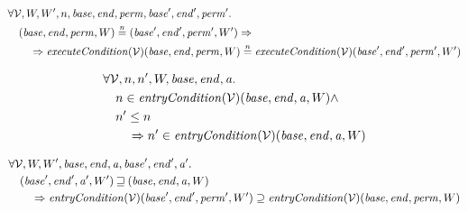 \documentclass{article}
\newcommand{\nequal}[1][n]{\stackrel{\tiny{#1}}{=}}
\newcommand{\var}[1]{\mathit{#1}}
\newcommand{\addr}{\var{a}}
\newcommand{\start}{\var{base}}
\newcommand{\addrend}{\var{end}}
\newcommand{\perm}{\var{perm}}
\newcommand{\plainfun}[2]{
  \ifthenelse{\equal{#2}{}}
             {\mathit{#1}}
             {\mathit{#1}(#2)}
}
\newcommand{\execCond}[1]{\plainfun{executeCondition}{#1}}
\newcommand{\entryCond}[1]{\plainfun{entryCondition}{#1}}
\newcommand{\future}{\mathbin{\sqsupseteq}}
\newcommand{\asmType}{\plaindom{AsmType}}
\newcommand{\plaindom}[1]{\mathrm{#1}}
\newcommand{\intr}[2]{\mathcal{#1}}
\newcommand{\valueintr}[1]{\intr{V}{#1}}
\newcommand{\stdvr}{\valueintr{\asmType}}
\begin{document}
\begin{lemma}
\label{lem:ec-ne-world}
  \begin{align*}
    &\forall \stdvr, W, W',n,\start,\addrend,\perm,\start',\addrend',\perm' \ldotp \\
    &\quad (\start,\addrend,\perm,W) \nequal (\start',\addrend',\perm',W') \Rightarrow \\
    &\qquad \Rightarrow \execCond{}(\stdvr)(\start,\addrend,\perm,W) \nequal \execCond{}(\stdvr)(\start',\addrend',\perm',W')
  \end{align*}
\end{lemma}

\begin{lemma}
\label{lem:en-dc}
  \begin{align*}
    &\forall \stdvr, n,n',W,\start, \addrend, \addr \ldotp \\
    &\quad  n \in \entryCond{}(\stdvr)(\start,\addrend,\addr,W) \land \\
    &\quad  n' \leq n \\
    &\qquad \Rightarrow n' \in \entryCond{}(\stdvr)(\start,\addrend,\addr,W)
  \end{align*}
\end{lemma}

\begin{lemma}
  \label{lem:en-mono-world}
  \begin{align*}
    &\forall \stdvr,W, W',\start, \addrend, \addr, \start', \addrend', \addr' \ldotp \\
    &\quad  (\start',\addrend',\addr',W') \future (\start,\addrend,\addr,W) \\
    &\qquad \Rightarrow \entryCond{}(\stdvr)(\start',\addrend',\perm',W') \supseteq \entryCond{}(\stdvr)(\start,\addrend,\perm,W)
  \end{align*}
\end{lemma}
\end{document}
